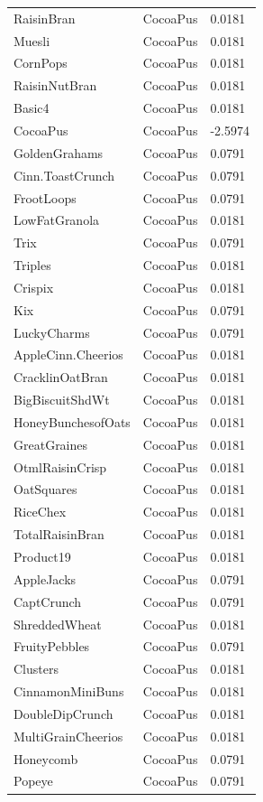 \begin{table}[!htbp]
\begin{tabular}{lll}
RaisinBran & CocoaPus & 0.0181
\\
Muesli & CocoaPus & 0.0181
\\
CornPops & CocoaPus & 0.0181
\\
RaisinNutBran & CocoaPus & 0.0181
\\
Basic4 & CocoaPus & 0.0181
\\
CocoaPus & CocoaPus & -2.5974
\\
GoldenGrahams & CocoaPus & 0.0791
\\
Cinn.ToastCrunch & CocoaPus & 0.0791
\\
FrootLoops & CocoaPus & 0.0791
\\
LowFatGranola & CocoaPus & 0.0181
\\
Trix & CocoaPus & 0.0791
\\
Triples & CocoaPus & 0.0181
\\
Crispix & CocoaPus & 0.0181
\\
Kix & CocoaPus & 0.0791
\\
LuckyCharms & CocoaPus & 0.0791
\\
AppleCinn.Cheerios & CocoaPus & 0.0181
\\
CracklinOatBran & CocoaPus & 0.0181
\\
BigBiscuitShdWt & CocoaPus & 0.0181
\\
HoneyBunchesofOats & CocoaPus & 0.0181
\\
GreatGraines & CocoaPus & 0.0181
\\
OtmlRaisinCrisp & CocoaPus & 0.0181
\\
OatSquares & CocoaPus & 0.0181
\\
RiceChex & CocoaPus & 0.0181
\\
TotalRaisinBran & CocoaPus & 0.0181
\\
Product19 & CocoaPus & 0.0181
\\
AppleJacks & CocoaPus & 0.0791
\\
CaptCrunch & CocoaPus & 0.0791
\\
ShreddedWheat & CocoaPus & 0.0181
\\
FruityPebbles & CocoaPus & 0.0791
\\
Clusters & CocoaPus & 0.0181
\\
CinnamonMiniBuns & CocoaPus & 0.0181
\\
DoubleDipCrunch & CocoaPus & 0.0181
\\
MultiGrainCheerios & CocoaPus & 0.0181
\\
Honeycomb & CocoaPus & 0.0791
\\
Popeye & CocoaPus & 0.0791
\\

\end{tabular}
\end{table}
